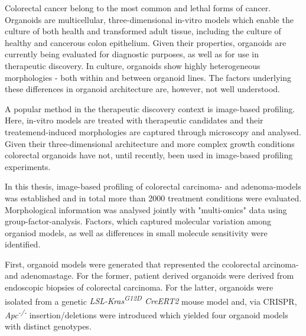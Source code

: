 Colorectal cancer belong to the most common and lethal forms of cancer. Organoids are multicellular, three-dimensional in-vitro models which enable the culture of both health and transformed adult tissue, including the culture of healthy and cancerous colon epithelium. Given their properties, organoids are currently being evaluated for diagnostic purposes, as well as for use in therapeutic discovery. In culture, organoids show highly heterogeneous morphologies - both within and between organoid lines. The factors underlying these differences in organoid architecture are, however, not well understood. 


A popular method in the therapeutic discovery context is image-based profiling. Here, in-vitro models are treated with therapeutic candidates and their treatemend-induced morphologies are captured through microscopy and analysed. Given their three-dimensional architecture and more complex growth conditions colorectal organoids have not, until recently, been used in image-based profiling experiments.
\bigbreak



In this thesis, image-based profiling of colorectal carcinoma- and adenoma-models was established and in total more than 2000 treatment conditions were evaluated. Morphological information was analysed jointly with "multi-omics" data using group-factor-analysis. Factors, which captured molecular variation among organiod models, as well as differences in small molecule sensitivity were identified.
\bigbreak

First, organoid models were generated that represented the ccolorectal arcinoma- and adenomastage. For the former, patient derived organoids were derived from endoscopic biopsies of colorectal carcinoma. For the latter, organoids were isolated from a genetic \textit{LSL-Kras\textsuperscript{G12D} CreERT2} mouse model and, via CRISPR, \textit{Apc\textsuperscript{-/-}} insertion/deletions were introduced which yielded four organoid models with distinct genotypes.
\bigbreak

